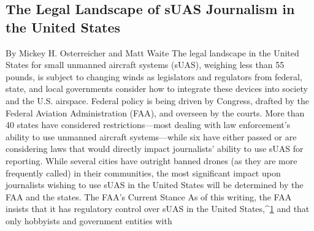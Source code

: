 \begin{itemize}
\section{The Legal Landscape of sUAS Journalism in the United States}
By Mickey H. Osterreicher and Matt Waite
The legal landscape in the United States for small unmanned aircraft systems
(sUAS), weighing less than 55 pounds, is subject to changing winds
as legislators and regulators from federal, state, and local governments
consider how to integrate these devices into society and the U.S. airspace.
Federal policy is being driven by Congress, drafted by the Federal Aviation
Administration (FAA), and overseen by the courts. More than 40 states
have considered restrictions—most dealing with law enforcement's ability
to use unmanned aircraft systems—while six have either passed or are considering
laws that would directly impact journalists' ability to use sUAS for
reporting. While several cities have outright banned drones (as they are
more frequently called) in their communities, the most significant impact
upon journalists wishing to use sUAS in the United States will be determined
by the FAA and the states.
The FAA's Current Stance
As of this writing, the FAA insists that it has regulatory control over sUAS
in the United States,^{\href{#endnotes-waite-and-osterreicher}{1}} and that only hobbyists and government entities with


\end{itemize}
